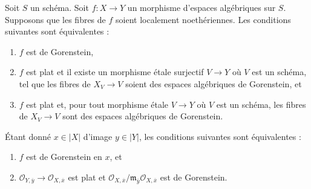 \begin{lemma}
\label{lemma-gorenstein}
Soit $S$ un schéma. Soit $f : X \to Y$ un morphisme d'espaces algébriques
sur $S$. Supposons que les fibres de $f$ soient localement noethériennes.
Les conditions suivantes sont équivalentes :
\begin{enumerate}
\item $f$ est de Gorenstein,
\item $f$ est plat et il existe un morphisme étale surjectif $V \to Y$
où $V$ est un schéma, tel que les fibres de $X_V \to V$
soient des espaces algébriques de Gorenstein, et
\item $f$ est plat et, pour tout morphisme étale $V \to Y$
où $V$ est un schéma, les fibres de $X_V \to V$
sont des espaces algébriques de Gorenstein.
\end{enumerate}
Étant donné $x \in |X|$ d'image $y \in |Y|$, les conditions suivantes sont
équivalentes :
\begin{enumerate}
\item[(a)] $f$ est de Gorenstein en $x$, et
\item[(b)] $\mathcal{O}_{Y, \overline{y}} \to \mathcal{O}_{X, \overline{x}}$
est plat et
$\mathcal{O}_{X, \overline{x}}/
\mathfrak m_{\overline{y}}\mathcal{O}_{X, \overline{x}}$ est de Gorenstein.
\end{enumerate}
\end{lemma}

